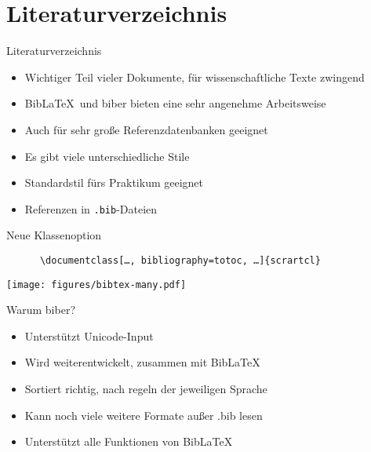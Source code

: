 \section{Literaturverzeichnis}

\begin{frame}[fragile]{Literaturverzeichnis}
  \begin{itemize}
    \item Wichtiger Teil vieler Dokumente, für wissenschaftliche Texte zwingend
    \item Bib\LaTeX\ und biber bieten eine sehr angenehme Arbeitsweise
    \item Auch für sehr große Referenzdatenbanken geeignet
    \item Es gibt viele unterschiedliche Stile
    \item Standardstil fürs Praktikum geeignet
    \item Referenzen in \texttt{.bib}-Dateien
  \end{itemize}
  \begin{block}{Neue Klassenoption}
    \begin{lstlisting}
      \documentclass[…, bibliography=totoc, …]{scrartcl}
    \end{lstlisting}
  \end{block}
\end{frame}

\begin{frame}
  \centering
  \texttt{[image: figures/bibtex-many.pdf]}
\end{frame}

\begin{frame}{Warum biber?}
  \begin{itemize}
    \item Unterstützt Unicode-Input
    \item Wird weiterentwickelt, zusammen mit Bib\LaTeX
    \item Sortiert richtig, nach regeln der jeweiligen Sprache
    \item Kann noch viele weitere Formate außer .bib lesen
    \item Unterstützt alle Funktionen von Bib\LaTeX
  \end{itemize}
\end{frame}

